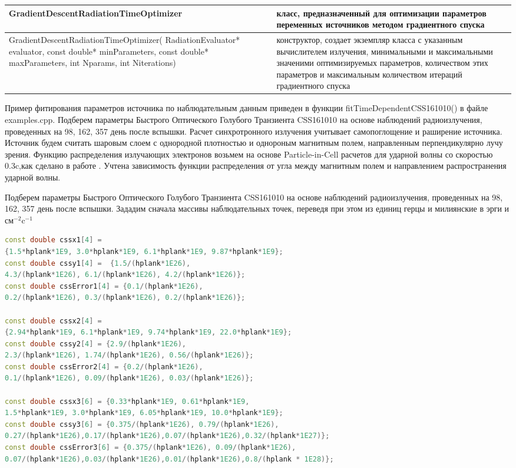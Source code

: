 \begin{small}
\begin{xtabular}{|p{0.5\textwidth}|p{0.5\textwidth}|}
		\hline
		\textbf{GradientDescentRadiationTimeOptimizer} & класс, предназначенный для оптимизации параметров переменных источников методом градиентного спуска\\
		\hline
		GradientDescentRadiationTimeOptimizer( RadiationEvaluator* evaluator, const double* minParameters, const double* maxParameters, int Nparams, int Niterations) & конструктор, создает экземпляр класса с указанным вычислителем излучения, минимальными и максимальными значеними оптимизируемых параметров, количеством этих параметров и максимальным количеством итераций градиентного спуска\\
		\hline		
\end{xtabular}
\end{small}

Пример фитирования параметров источника по наблюдательным данным приведен в функции fitTimeDependentCSS161010() в файле examples.cpp. Подберем параметры Быстрого Оптического Голубого Транзиента CSS161010 на основе наблюдений радиоизлучения, проведенных на 98, 162, 357 день после вспышки.  Расчет синхротронного излучения учитывает самопоглощение и раширение источника. Источник будем считать шаровым слоем с однородной плотностью и однороным магнитным полем, направленным перпендикулярно лучу зрения. Функцию распределения излучающих электронов возьмем на основе Particle-in-Cell расчетов для ударной волны со скоростью 0.3c,как сделано в работе \cite{BykovUniverse}. Учтена зависимость функции распределения от угла между магнитным полем и направлением распространения ударной волны.

Подберем параметры Быстрого Оптического Голубого Транзиента CSS161010 на основе наблюдений радиоизлучения, проведенных на 98, 162, 357 день после вспышки.  Зададим сначала массивы наблюдательных точек, переведя при этом из единиц герцы и милиянские в эрги и $\text{см}^{-2} \text{c}^{-1}$
\begin{lstlisting}[language=c++]
const double cssx1[4] = 
{1.5*hplank*1E9, 3.0*hplank*1E9, 6.1*hplank*1E9, 9.87*hplank*1E9};
const double cssy1[4] =  {1.5/(hplank*1E26), 
4.3/(hplank*1E26), 6.1/(hplank*1E26), 4.2/(hplank*1E26)};
const double cssError1[4] = {0.1/(hplank*1E26), 
0.2/(hplank*1E26), 0.3/(hplank*1E26), 0.2/(hplank*1E26)};
	
const double cssx2[4] = 
{2.94*hplank*1E9, 6.1*hplank*1E9, 9.74*hplank*1E9, 22.0*hplank*1E9};
const double cssy2[4] = {2.9/(hplank*1E26), 
2.3/(hplank*1E26), 1.74/(hplank*1E26), 0.56/(hplank*1E26)};
const double cssError2[4] = {0.2/(hplank*1E26), 
0.1/(hplank*1E26), 0.09/(hplank*1E26), 0.03/(hplank*1E26)};
	
const double cssx3[6] = {0.33*hplank*1E9, 0.61*hplank*1E9, 
1.5*hplank*1E9, 3.0*hplank*1E9, 6.05*hplank*1E9, 10.0*hplank*1E9};
const double cssy3[6] = {0.375/(hplank*1E26), 0.79/(hplank*1E26), 
0.27/(hplank*1E26),0.17/(hplank*1E26),0.07/(hplank*1E26),0.32/(hplank*1E27)};
const double cssError3[6] = {0.375/(hplank*1E26), 0.09/(hplank*1E26),
0.07/(hplank*1E26),0.03/(hplank*1E26),0.01/(hplank*1E26),0.8/(hplank * 1E28)};
\end{lstlisting}

